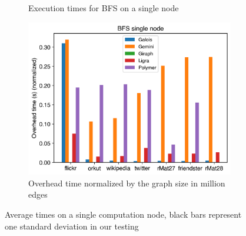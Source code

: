 \begin{figure}
\begin{subfigure}{0.3\textwidth}
		\caption{Execution times for BFS on a single node}
		\label{fig:singleNodeBFS_exec}
	\end{subfigure}
	\hfil
	\begin{subfigure}{0.3\textwidth}
		\includegraphics[width=\linewidth]{../../plots/singleNodeBFS_overheadTimeNormalized.png}
		\caption{Overhead time normalized by the graph size in million edges}
		\label{fig:singleNodeBFS_overheadNormalized}
	\end{subfigure}
	
	\caption{Average times on a single computation node, black bars represent one standard deviation in our testing}
\end{figure}



